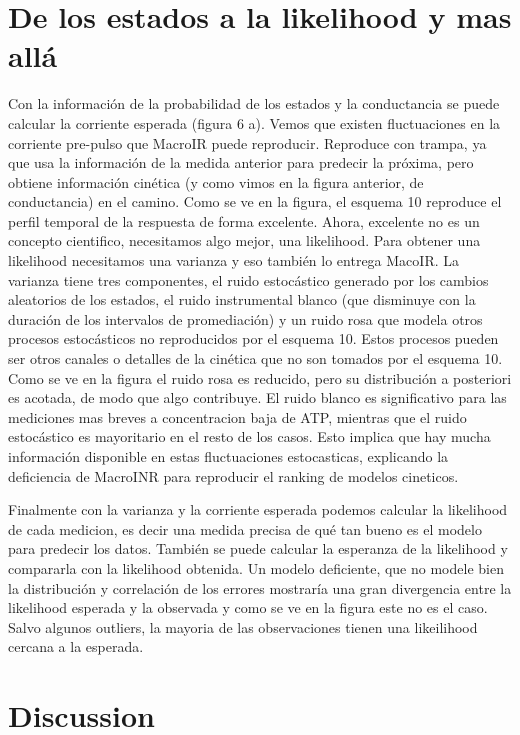 \documentclass[a4paper,12pt]{article}
\begin{document}
		\section{De los estados a la likelihood y mas allá}
		Con la información de la probabilidad de los estados y la conductancia se puede calcular la corriente esperada (figura 6 a). Vemos que existen fluctuaciones en la corriente pre-pulso que MacroIR puede reproducir. Reproduce con trampa, ya que usa la información de la medida anterior para predecir la próxima, pero obtiene información cinética (y como vimos en la figura anterior, de conductancia) en el camino. Como se ve en la figura, el esquema 10 reproduce el perfil temporal de la respuesta de forma excelente. 
		Ahora, excelente no es un concepto cientifico, necesitamos algo mejor, una likelihood. Para obtener una likelihood necesitamos una varianza y eso también lo entrega MacoIR. La varianza tiene tres componentes, el ruido estocástico generado por los cambios aleatorios de los estados, el ruido instrumental blanco (que disminuye con la duración de los intervalos de promediación) y un ruido rosa que modela otros procesos estocásticos no reproducidos por el esquema 10. Estos procesos pueden ser otros canales o detalles de la cinética que no son tomados por el esquema 10. Como se ve en la figura el ruido rosa es reducido, pero su distribución a posteriori es acotada, de modo que algo contribuye. El ruido blanco es significativo para las mediciones mas breves a concentracion baja de ATP, mientras que el ruido estocástico es mayoritario en el resto de los casos. Esto implica que hay mucha información disponible en estas fluctuaciones estocasticas, explicando la deficiencia de MacroINR para reproducir el ranking de modelos cineticos. 
		
		Finalmente con la varianza y la corriente esperada podemos calcular la likelihood de cada medicion, es decir una medida precisa de qué tan bueno es el modelo para predecir los datos. También se puede calcular la esperanza de la likelihood y compararla con la likelihood obtenida. Un modelo deficiente, que no modele bien la distribución y correlación de los errores mostraría una gran divergencia entre la likelihood esperada y la observada y como se ve en la figura este no es el caso. Salvo algunos outliers, la mayoria de las observaciones tienen una likeilihood cercana a la esperada. 
		
		\section{Discussion}
		
\end{document}
